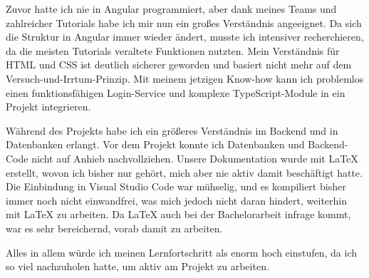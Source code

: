 Zuvor hatte ich nie in Angular programmiert, aber dank meines Teams und zahlreicher Tutorials habe ich mir nun ein großes Verständnis angeeignet. 
Da sich die Struktur in Angular immer wieder ändert, musste ich intensiver recherchieren, da die meisten Tutorials veraltete Funktionen nutzten. 
Mein Verständnis für HTML und CSS ist deutlich sicherer geworden und basiert nicht mehr auf dem Versuch-und-Irrtum-Prinzip. 
Mit meinem jetzigen Know-how kann ich problemlos einen funktionsfähigen Login-Service und komplexe TypeScript-Module in ein Projekt integrieren.

Während des Projekts habe ich ein größeres Verständnis im Backend und in Datenbanken erlangt. 
Vor dem Projekt konnte ich Datenbanken und Backend-Code nicht auf Anhieb nachvollziehen. 
Unsere Dokumentation wurde mit LaTeX erstellt, wovon ich bisher nur gehört, mich aber nie aktiv damit beschäftigt hatte. 
Die Einbindung in Visual Studio Code war mühselig, und es kompiliert bisher immer noch nicht einwandfrei, was mich jedoch nicht daran hindert, weiterhin mit LaTeX zu arbeiten. 
Da LaTeX auch bei der Bachelorarbeit infrage kommt, war es sehr bereichernd, vorab damit zu arbeiten.

Alles in allem würde ich meinen Lernfortschritt als enorm hoch einstufen, da ich so viel nachzuholen hatte, um aktiv am Projekt zu arbeiten.

